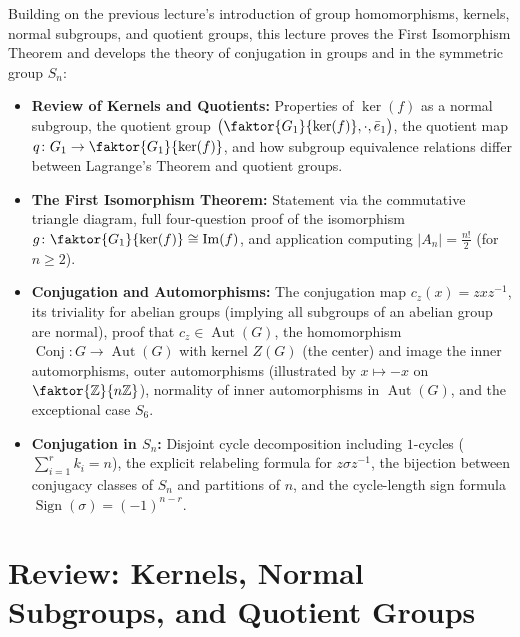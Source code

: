 \begin{overview}
Building on the previous lecture's introduction of group homomorphisms, kernels, normal subgroups, and quotient groups, this lecture proves the First Isomorphism Theorem and develops the theory of conjugation in groups and in the symmetric group $S_n$:
\begin{itemize}
    \item \textbf{Review of Kernels and Quotients:} Properties of $\ker(f)$ as a normal subgroup, the quotient group $\bigl(\faktor{G_1}{\ker(f)}, \cdot, \bar{e}_1\bigr)$, the quotient map $q \colon G_1 \to \faktor{G_1}{\ker(f)}$, and how subgroup equivalence relations differ between Lagrange's Theorem and quotient groups.
    \item \textbf{The First Isomorphism Theorem:} Statement via the commutative triangle diagram, full four-question proof of the isomorphism $g \colon \faktor{G_1}{\ker(f)} \cong \operatorname{Im}(f)$, and application computing $|A_n| = \frac{n!}{2}$ (for $n \ge 2$).
    \item \textbf{Conjugation and Automorphisms:} The conjugation map $c_z(x) = z x z^{-1}$, its triviality for abelian groups (implying all subgroups of an abelian group are normal), proof that $c_z \in \operatorname{Aut}(G)$, the homomorphism $\operatorname{Conj} \colon G \to \operatorname{Aut}(G)$ with kernel $Z(G)$ (the center) and image the inner automorphisms, outer automorphisms (illustrated by $x \mapsto -x$ on $\faktor{\mathbb{Z}}{n\mathbb{Z}}$), normality of inner automorphisms in $\operatorname{Aut}(G)$, and the exceptional case $S_6$.
    \item \textbf{Conjugation in $S_n$:} Disjoint cycle decomposition including $1$-cycles ($\sum_{i=1}^r k_i = n$), the explicit relabeling formula for $z \sigma z^{-1}$, the bijection between conjugacy classes of $S_n$ and partitions of $n$, and the cycle-length sign formula $\operatorname{Sign}(\sigma) = (-1)^{n-r}$.
\end{itemize}
\end{overview}

\section{Review: Kernels, Normal Subgroups, and Quotient Groups}

